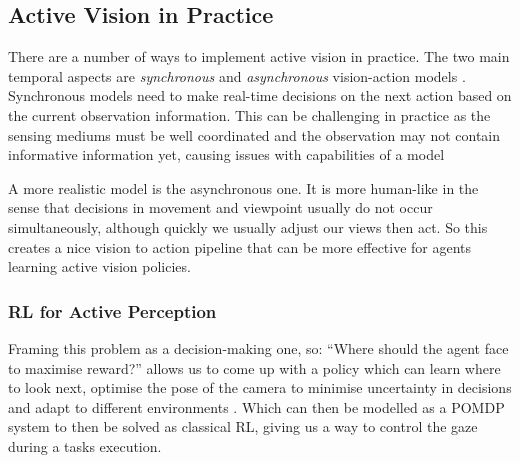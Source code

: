   
  \subsection{Active Vision in Practice}
  There are a number of ways to implement active vision in practice. The two main temporal aspects are \emph{synchronous} and \emph{asynchronous} vision-action models \cite{divyaHandEyeCoordsination}. Synchronous models need to make real-time decisions on the next action based on the current observation information. This can be challenging in practice as the sensing mediums must be well coordinated and the observation may not contain informative information yet, causing issues with capabilities of a model\label{sec:asynch-synch}

  A more realistic model is the asynchronous one. It is more human-like in the sense that decisions in movement and viewpoint usually do not occur simultaneously, although quickly we usually adjust our views then act. So this creates a nice vision to action pipeline that can be more effective for agents learning active vision policies.
  

  \subsubsection{RL for Active Perception}
    Framing this problem as a decision-making one, so: ``Where should the agent face to maximise reward?'' allows us to come up with a policy which can learn where to look next, optimise the pose of the camera to minimise uncertainty in decisions and adapt to different environments \cite{rothbucher2011,zhangembodied}. Which can then be modelled as a POMDP system to then be solved as classical RL, giving us a way to control the gaze during a tasks execution.

